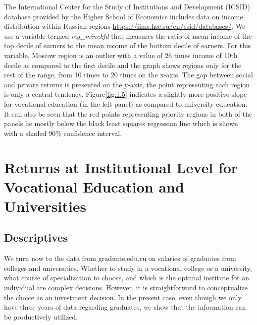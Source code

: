 \documentclass[alpha-refs]{wiley-article-05g}
\begin{document}
The  International Center for the Study of Institutions and Development (ICSID) database provided by the Higher School of Economics includes data on income distribution within Russian regions \url{https://iims.hse.ru/en/csid/databases/}. We use a variable termed \textit{reg\_minckfd} that measures the ratio of mean income of the top decile of earners to the mean income of the bottom decile of earners. For this variable, Moscow region is an outlier with a value of 26 times income of 10th decile as compared to the first decile and the graph shows regions only for the rest of the range, from 10 times to 20 times on the x-axis. The gap between social and private returns is presented on the y-axis, the point representing each region is only a central tendency. Figure\ref{fig:1.5} indicates a slightly more positive slope for vocational education (in the left panel) as compared to university education. It can also be seen that the red points representing priority regions in both of the panels lie mostly below the black least squares regression line which is shown with a shaded 90\% confidence interval.

\vspace{-2em}

\section{Returns at Institutional Level for Vocational Education and Universities} 

\subsection{Descriptives}

We turn now to the data from graduate.edu.ru on salaries of graduates from colleges and universities. Whether to study in a vocational college or a university, what course of specialization to choose, and which is the optimal institute for an individual are complex decisions. However, it is straightforward to conceptualize the choice as an investment decision. In the present case, even though we only have three years of data regarding graduates, we show that the information can be productively utilized. 
\end{document}
